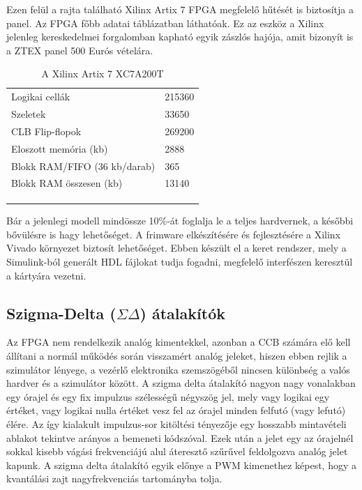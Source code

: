 Ezen felül a rajta található Xilinx Artix 7 FPGA megfelelő hűtését is biztosítja a panel. Az FPGA főbb adatai  táblázatban láthatóak. Ez az eszköz a Xilinx jelenleg kereskedelmei forgalomban kapható egyik zászlós hajója, amit bizonyít is a ZTEX panel 500 Eurós vételára.

\begin{table}[]
\centering
\begin{tabular}{ll}
Logikai cellák               & 215360 \\
Szeletek                     & 33650  \\
CLB Flip-flopok              & 269200 \\
Eloszott memória (kb)        & 2888   \\
Blokk RAM/FIFO (36 kb/darab) & 365    \\
Blokk RAM összesen (kb)      & 13140  \\
                             &        \\
                             &        \\
                             & 
  
\end{tabular}
\caption{A Xilinx Artix 7 XC7A200T}
\label{tab:artix7spec}    
\end{table}

Bár a jelenlegi modell mindössze 10\%-át foglalja le a teljes hardvernek, a későbbi bővülésre is hagy lehetőséget. A frimware elkészítésére és fejlesztésére a Xilinx Vivado környezet biztosít lehetőséget. Ebben készült el a keret rendszer, mely a Simulink-ból generált HDL fájlokat tudja fogadni, megfelelő interfészen keresztül a kártyára vezetni.


\subsection{Szigma-Delta ($\Sigma{}\Delta{}$) átalakítók}

Az FPGA nem rendelkezik analóg kimentekkel, azonban a CCB számára elő kell állítani a normál működés során visszamért analóg jeleket, hiszen ebben rejlik a szimulátor lényege, a vezérlő elektronika szemszögéből nincsen különbség a valós hardver és a szimulátor között. A szigma delta átalakító nagyon nagy vonalakban egy órajel és egy fix impulzus szélességű négyszög jel, mely vagy logikai egy értéket, vagy logikai nulla értéket vesz fel az órajel minden felfutó (vagy lefutó) élére. Az így kialakult impulzus-sor kitöltési tényezője egy hosszabb mintavételi ablakot tekintve arányos a bemeneti kódszóval. Ezek után a jelet egy az órajelnél sokkal kisebb vágási frekvenciájú alul áteresztő szűrűvel feldolgozva analóg jelet kapunk. A szigma delta átalakító egyik előnye a PWM kimenethez képest, hogy a kvantálási zajt nagyfrekvenciás tartományba tolja. \cite{artofelectronics}

